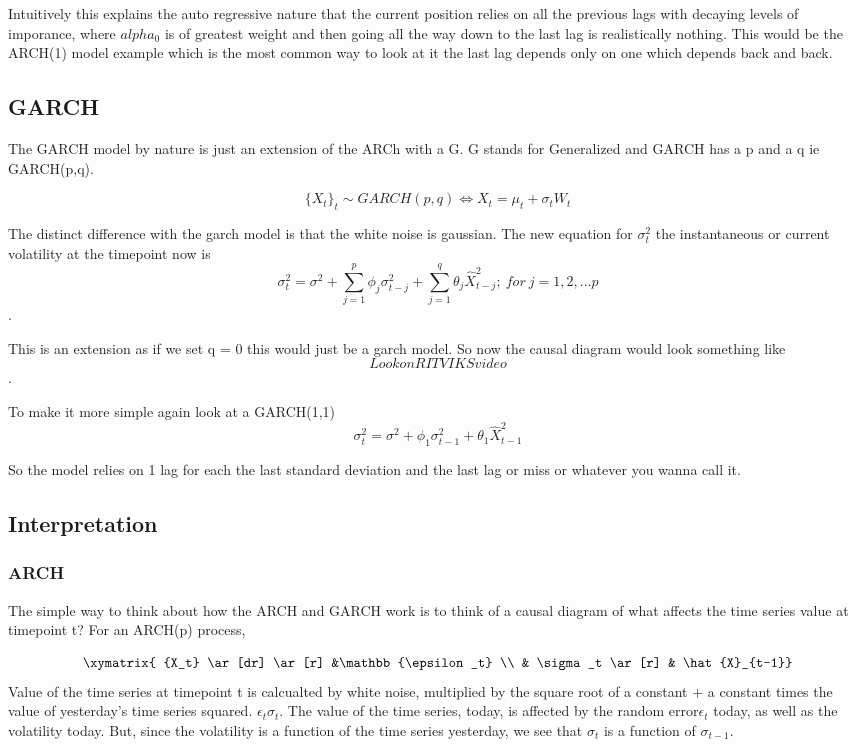 Intuitively this explains the auto regressive nature that the current position relies on all the previous lags with decaying levels of imporance, where $alpha_0$ is of greatest weight and then going all the way down to the last lag is realistically nothing. This would be the ARCH(1) model example which is the most common way to look at it the last lag depends only on one which depends back and back. 

\subsection{GARCH}

The GARCH model by nature is just an extension of the ARCh with a G. G stands for Generalized and GARCH has a p and a q ie GARCH(p,q). 

$$\{X_t\}_t \sim GARCH(p,q) \iff X_t = \mu_t+\sigma_tW_t$$

The distinct difference with the garch model is that the white noise is gaussian. The new equation for $\sigma^2_t$ the instantaneous or current volatility at the timepoint now is $$\sigma_t^2 = \sigma^2 + \sum^p_{j=1} \phi_j\sigma^2_{t-j}+ \sum^q_{j=1} \theta_j\hat{X}^2_{t-j}; ~ for~j = 1,2,...p$$ \cite{carmona2004}.

This is an extension as if we set q = 0 this would just be a garch model. So now the causal diagram would look something like $$ Look on RITVIKS video$$.

To make it more simple again look at a GARCH(1,1) 
$$\sigma^2_t = \sigma^2 +\phi_1\sigma^2_{t-1}+\theta_1\hat{X}^2_{t-1}$$

So the model relies on 1 lag for each the last standard deviation and the last lag or miss or whatever you wanna call it.

\subsection{Interpretation}
\subsubsection{ARCH}
The simple way to think about how the ARCH and GARCH work is to think of a causal diagram of what affects the time series value at timepoint t?    
For an ARCH(p) process, 

$$
\xymatrix{
{X_t} \ar[dr] \ar[r] &\mathbb{\epsilon_t} \\
 & \sigma_t \ar[r] & \hat{X}_{t-1}}
$$
Value of the time series at timepoint t is calcualted by white noise, multiplied by the square root of a constant + a constant times the value of yesterday's time series squared. $\epsilon_t\sigma_t$. The value of the time series, today, is affected by the random error$\epsilon_t$ today, as well as the volatility today. But, since the volatility is a function of the time series yesterday, we see that $\sigma_t$ is a function of $\sigma_{t-1}$. 

